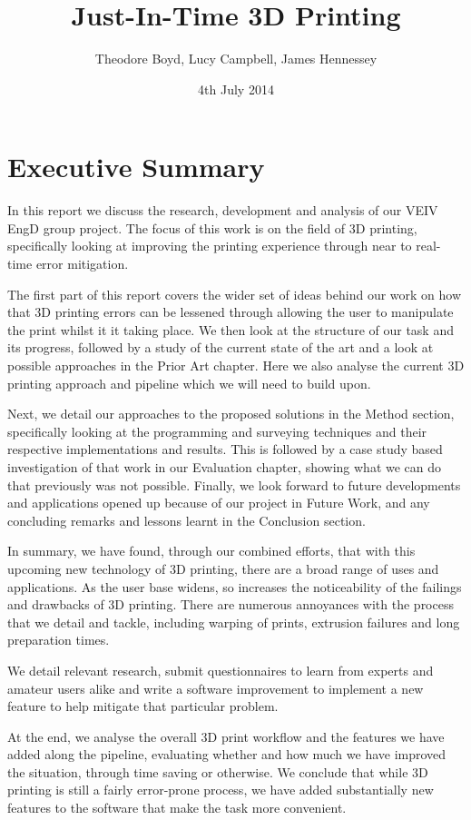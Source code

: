 \documentclass[11pt]{report} %
\title{Just-In-Time 3D Printing}
\author{Theodore Boyd, Lucy Campbell, James Hennessey}
\date{4th July 2014} %
\begin{document}
\maketitle

\chapter{Executive Summary}
In this report we discuss the research, development and analysis of our VEIV EngD group project. The focus of this work is on the field of 3D printing, specifically looking at improving the printing experience through near to real-time error mitigation.

The first part of this report covers the wider set of ideas behind our work on how that 3D printing errors can be lessened through allowing the user to manipulate the print whilst it it taking place. We then look at the structure of our task and its progress, followed by a study of the current state of the art and a look at possible approaches in the Prior Art chapter. Here we also analyse the current 3D printing approach and pipeline which we will need to build upon.

Next, we detail our approaches to the proposed solutions in the Method section, specifically looking at the programming and surveying techniques and their respective implementations and results. This is followed by a case study based investigation of that work in our Evaluation chapter, showing what we can do that previously was not possible.
Finally, we look forward to future developments and applications opened up because of our project in Future Work, and any concluding remarks and lessons learnt in the Conclusion section.

In summary, we have found, through our combined efforts, that with this upcoming new technology of 3D printing, there are a broad range of uses and applications. As the user base widens, so increases the noticeability of the failings and drawbacks of 3D printing. There are numerous annoyances with the process that we detail and tackle, including warping of prints, extrusion failures and long preparation times.

We detail relevant research, submit questionnaires to learn from experts and amateur users alike and write a software improvement to implement a new feature to help mitigate that particular problem.

At the end, we analyse the overall 3D print workflow and the features we have added along the pipeline, evaluating whether and how much we have improved the situation, through time saving or otherwise. We conclude that while 3D printing is still a fairly error-prone process, we have added substantially new features to the software that make the task more convenient.
\end{document}
